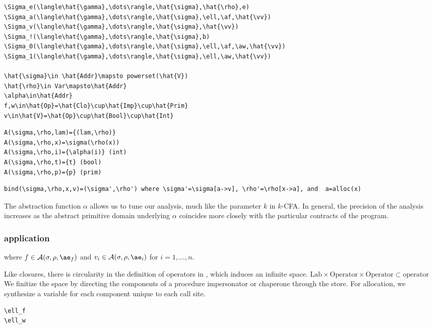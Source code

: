 \documentclass{sigplanconf}
\begin{document}
\begin{verbatim}
\Sigma_e(\langle\hat{\gamma},\dots\rangle,\hat{\sigma},\hat{\rho},e)
\Sigma_a(\langle\hat{\gamma},\dots\rangle,\hat{\sigma},\ell,\af,\hat{\vv})
\Sigma_v(\langle\hat{\gamma},\dots\rangle,\hat{\sigma},\hat{\vv})
\Sigma_!(\langle\hat{\gamma},\dots\rangle,\hat{\sigma},b)
\Sigma_0(\langle\hat{\gamma},\dots\rangle,\hat{\sigma},\ell,\af,\aw,\hat{\vv})
\Sigma_1(\langle\hat{\gamma},\dots\rangle,\hat{\sigma},\ell,\aw,\hat{\vv})

\hat{\sigma}\in \hat{Addr}\mapsto powerset(\hat{V})
\hat{\rho}\in Var\mapsto\hat{Addr}
\alpha\in\hat{Addr}
f,w\in\hat{Op}=\hat{Clo}\cup\hat{Imp}\cup\hat{Prim}
v\in\hat{V}=\hat{Op}\cup\hat{Bool}\cup\hat{Int}
\end{verbatim}

\begin{verbatim}
A(\sigma,\rho,lam)={(lam,\rho)}
A(\sigma,\rho,x)=\sigma(\rho(x))
A(\sigma,\rho,i)={\alpha(i)} (int)
A(\sigma,\rho,t)={t} (bool)
A(\sigma,\rho,p)={p} (prim)
\end{verbatim}

\begin{verbatim}
bind(\sigma,\rho,x,v)=(\sigma',\rho') where \sigma'=\sigma[a->v], \rho'=\rho[x->a], and  a=alloc(x)
\end{verbatim}

The abstraction function $\alpha$ allows us to tune our analysis, much like the parameter $k$ in $k$-CFA.
In general, the precision of the analysis increases as the abstract primitive domain underlying $\alpha$ coincides more closely with the particular contracts of the program.

\subsubsection{application}

\noindent
{}

\noindent
where $f\in\A{\sigma}{\rho}{\ae_f}$ and $v_i\in\A{\sigma}{\rho}{\ae_i}$ for $i=1,\dots,n$.

Like closures, there is circularity in the definition of operators in \chapcalc, which induces an infinite space.
$\mathrm{Lab}\times\mathrm{Operator}\times\mathrm{Operator}\subset\mathrm{operator}$
We finitize the space by directing the components of a procedure impersonator or chaperone through the store.
For allocation, we synthesize a variable for each component unique to each call site.
\begin{verbatim}
\ell_f
\ell_w
\end{verbatim}
\end{document}
